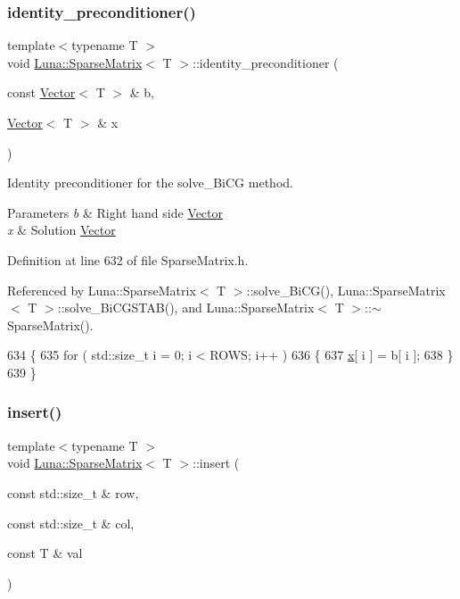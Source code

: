 \subsubsection{\texorpdfstring{identity\+\_\+preconditioner()}{identity\_preconditioner()}}
{\footnotesize\ttfamily template$<$typename T $>$ \\
void \hyperlink{classLuna_1_1SparseMatrix}{Luna\+::\+Sparse\+Matrix}$<$ T $>$\+::identity\+\_\+preconditioner (\begin{DoxyParamCaption}\item[{const \hyperlink{classLuna_1_1Vector}{Vector}$<$ T $>$ \&}]{b,  }\item[{\hyperlink{classLuna_1_1Vector}{Vector}$<$ T $>$ \&}]{x }\end{DoxyParamCaption})\hspace{0.3cm}{\ttfamily [inline]}}



Identity preconditioner for the solve\+\_\+\+Bi\+CG method. 


\begin{DoxyParams}{Parameters}
{\em b} & Right hand side \hyperlink{classLuna_1_1Vector}{Vector} \\
\hline
{\em x} & Solution \hyperlink{classLuna_1_1Vector}{Vector} \\
\hline
\end{DoxyParams}


Definition at line 632 of file Sparse\+Matrix.\+h.



Referenced by Luna\+::\+Sparse\+Matrix$<$ T $>$\+::solve\+\_\+\+Bi\+C\+G(), Luna\+::\+Sparse\+Matrix$<$ T $>$\+::solve\+\_\+\+Bi\+C\+G\+S\+T\+A\+B(), and Luna\+::\+Sparse\+Matrix$<$ T $>$\+::$\sim$\+Sparse\+Matrix().


\begin{DoxyCode}
634   \{
635     \textcolor{keywordflow}{for} ( std::size\_t i = 0; i < ROWS; i++ )
636     \{
637       \hyperlink{namespaceHeat__plot_aa88370c16b85b784ccbde3ed88bc1991}{x}[ i ] =  b[ i ];
638     \}
639   \}
\end{DoxyCode}
\mbox{\label{classLuna_1_1SparseMatrix_a88b48b128919c77faa81616a2e5942af}} 
\subsubsection{\texorpdfstring{insert()}{insert()}}
{\footnotesize\ttfamily template$<$typename T $>$ \\
void \hyperlink{classLuna_1_1SparseMatrix}{Luna\+::\+Sparse\+Matrix}$<$ T $>$\+::insert (\begin{DoxyParamCaption}\item[{const std\+::size\+\_\+t \&}]{row,  }\item[{const std\+::size\+\_\+t \&}]{col,  }\item[{const T \&}]{val }\end{DoxyParamCaption})\hspace{0.3cm}{\ttfamily [inline]}}



